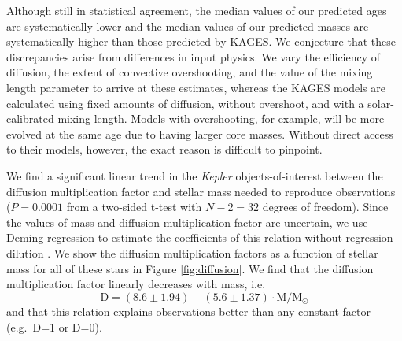 \documentclass[twocolumn,twocolappendix]{aastex6}
\newif\ifref
\newcommand{\mb}[1]{\ifref\boldmath\textbf{#1}\unboldmath\else #1\fi}
\begin{document}
Although still in statistical agreement, the median values of our predicted ages are systematically lower and the median values of our predicted masses are systematically higher than those predicted by KAGES. We conjecture that these discrepancies arise from differences in input physics. We vary the efficiency of diffusion, the extent of convective overshooting, and the value of the mixing length parameter to arrive at these estimates, whereas \mb{the KAGES} models are calculated using fixed \mb{amounts} of diffusion, without overshoot, and with a solar-calibrated mixing length. Models with overshooting, for example, will be more evolved at the same age due to having larger core masses. Without direct access to their models, however, the exact reason is difficult to pinpoint. 

We find a significant linear trend in the \emph{Kepler} objects-of-interest between the diffusion multiplication factor and stellar mass needed to reproduce observations ($P = 0.0001$ from a two-sided t-test with $N-2=32$ degrees of freedom). Since the values of mass and diffusion \mb{multiplication} factor are uncertain, we use Deming regression to estimate the coefficients of this relation without regression dilution \citep{deming1943statistical}. We show the diffusion multiplication factors as a function of stellar mass for all of these stars in Figure \ref{fig:diffusion}. We find that the diffusion \mb{multiplication} factor linearly decreases with mass, i.e.\ 
\begin{equation} \label{eq:diffusion}
    \text{D} = ( 8.6 \pm 1.94 ) - ( 5.6 \pm 1.37 ) \cdot \text{M}/\text{M}_\odot
\end{equation}
and that this relation explains observations better than any constant factor (e.g.\ D=1 or D=0). 
\end{document}
